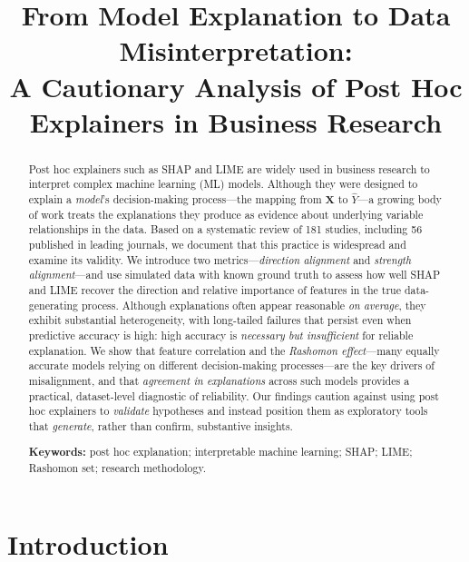 \documentclass[12pt,letterpaper]{article}
\title{\bf From Model Explanation to Data Misinterpretation:\\
A Cautionary Analysis of Post Hoc Explainers in Business Research}
\author{}
\date{}
\newcommand{\bX}{\mathbf{X}}
\begin{document}
\maketitle

\begin{abstract}
\noindent
Post hoc explainers such as SHAP and LIME are widely used in business research to
interpret complex machine learning (ML) models. Although they were designed to
explain a \emph{model}'s decision-making process---the mapping from $\bX$ to
$\hat{Y}$---a growing body of work treats the explanations
they produce as evidence about underlying variable relationships in the data. Based on a
systematic review of 181 studies, including 56 published in leading journals, we
document that this practice is widespread and examine its validity. We introduce
two metrics---\emph{direction alignment} and \emph{strength alignment}---and use
simulated data with known ground truth to assess how well SHAP and LIME recover
the direction and relative importance of features in the true data-generating
process. Although explanations often appear reasonable \emph{on average}, they
exhibit substantial heterogeneity, with long-tailed failures that persist even
when predictive accuracy is high: high accuracy is \emph{necessary but
insufficient} for reliable explanation. We show that feature correlation and the
\emph{Rashomon effect}---many equally accurate models relying on different
decision-making processes---are the key drivers of misalignment, and that \emph{agreement in
explanations} across such models provides a practical, dataset-level diagnostic
of reliability. Our findings caution against using post hoc explainers to
\emph{validate} hypotheses and instead position them as exploratory tools that
\emph{generate}, rather than confirm, substantive insights.

\smallskip
\noindent\textbf{Keywords:} post hoc explanation; interpretable machine learning;
SHAP; LIME; Rashomon set; research methodology.
\end{abstract}

\section{Introduction}
\label{sec:intro}
\end{document}
